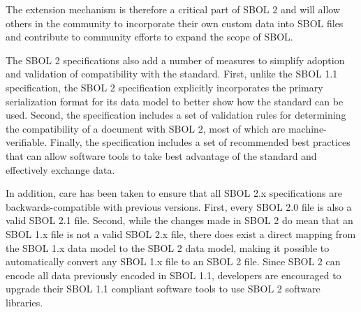 The extension mechanism is therefore a critical part of SBOL 2 and will allow others in the community to incorporate their own custom data into SBOL files and contribute to community efforts to expand the scope of SBOL.


The SBOL 2 specifications also add a number of measures to simplify adoption and validation of compatibility with the standard.
First, unlike the SBOL 1.1 specification, the SBOL 2 specification explicitly incorporates the primary serialization format for its data model to better show how the standard can be used. Second, the specification includes a set of validation rules for determining the compatibility of a document with SBOL 2, most of which are machine-verifiable. Finally, the specification includes a set of recommended best practices that can allow software tools to take best advantage of the standard and effectively exchange data.

In addition, care has been taken to ensure that all SBOL 2.x specifications are backwards-compatible with previous versions.
First, every SBOL 2.0 file is also a valid SBOL 2.1 file.
Second, while the changes made in SBOL 2 do mean that an SBOL 1.x file is not a valid SBOL 2.x file, there does exist a direct mapping from the SBOL 1.x data model to the SBOL 2 data model, making it possible to automatically convert any SBOL 1.x file to an SBOL 2 file.
Since SBOL 2 can encode all data previously encoded in SBOL 1.1, developers are encouraged to upgrade their SBOL 1.1 compliant software tools to use SBOL 2 software libraries. 

